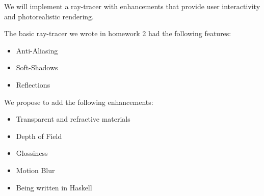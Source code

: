 \documentclass[12pt]{article}
\begin{document}
We will implement a ray-tracer with enhancements that provide user interactivity and photorealistic rendering.

The basic ray-tracer we wrote in homework 2 had the following features:
\begin{itemize}
    \item Anti-Aliasing

    \item Soft-Shadows

    \item Reflections
\end{itemize}

We propose to add the following enhancements:
\begin{itemize}
    \item Transparent and refractive materials

    \item Depth of Field

    \item Glossiness

    \item Motion Blur

    \item Being written in Haskell
\end{itemize}
\end{document}

